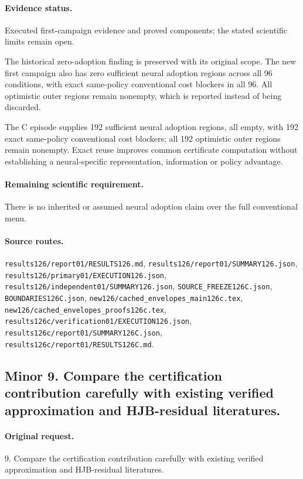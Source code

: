 \paragraph{Evidence status.} Executed first-campaign evidence and proved components; the stated scientific limits remain open.

The historical zero-adoption finding is preserved with its original scope. The new first campaign also has zero sufficient neural adoption regions across all 96 conditions, with exact same-policy conventional cost blockers in all 96. All optimistic outer regions remain nonempty, which is reported instead of being discarded.\par
The C episode supplies 192 sufficient neural adoption regions, all empty, with 192 exact same-policy conventional cost blockers; all 192 optimistic outer regions remain nonempty. Exact reuse improves common certificate computation without establishing a neural-specific representation, information or policy advantage.\par

\paragraph{Remaining scientific requirement.} There is no inherited or assumed neural adoption claim over the full conventional menu.

\paragraph{Source routes.} \nolinkurl{results126/report01/RESULTS126.md}, \nolinkurl{results126/report01/SUMMARY126.json}, \nolinkurl{results126/primary01/EXECUTION126.json}, \nolinkurl{results126/independent01/SUMMARY126.json}, \nolinkurl{SOURCE_FREEZE126C.json}, \nolinkurl{BOUNDARIES126C.json}, \nolinkurl{new126/cached_envelopes_main126c.tex}, \nolinkurl{new126/cached_envelopes_proofs126c.tex}, \nolinkurl{results126c/verification01/EXECUTION126.json}, \nolinkurl{results126c/report01/SUMMARY126C.json}, \nolinkurl{results126c/report01/RESULTS126C.md}.

\subsection*{Minor 9. Compare the certification contribution carefully with existing verified approximation and HJB-residual literatures.}
\paragraph{Original request.} 9. Compare the certification contribution carefully with existing verified approximation and HJB-residual literatures.

